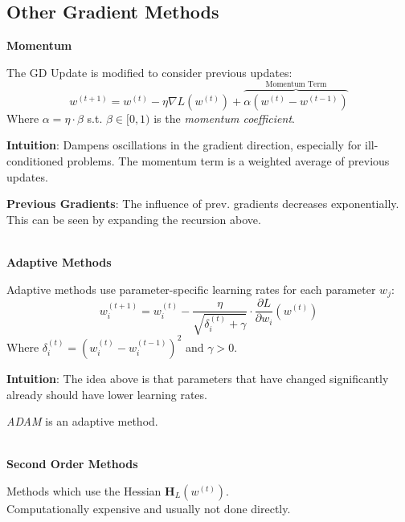 \newpage

\subsection{Other Gradient Methods}

\method \textbf{Momentum}

The GD Update is modified to consider previous updates:
$$
    w^{(t+1)} = w^{(t)} - \eta \nabla L(w^{(t)}) + \overbrace{\alpha (w^{(t)} - w^{(t-1)})}^\text{Momentum Term}
$$
Where $\alpha = \eta \cdot \beta$ s.t. $\beta \in [0,1)$ is the \textit{momentum coefficient}.

{\footnotesize
    \remark \textbf{Intuition}: Dampens oscillations in the gradient direction, especially for ill-conditioned problems. The momentum term is a weighted average of previous updates.

    \remark \textbf{Previous Gradients}: The influence of prev. gradients decreases exponentially. This can be seen by expanding the recursion above.
}
\\

\method \textbf{Adaptive Methods}

Adaptive methods use parameter-specific learning rates for each parameter $w_j$:
$$
    w^{(t+1)}_i = w^{(t)}_i - \frac{\eta}{\sqrt{\delta_i^{(t)} + \gamma}}\cdot\frac{\partial L}{\partial w_i}(w^{(t)})
$$
Where $\delta_i^{(t)} = (w_i^{(t)} - w_i^{(t-1)})^2$ and $\gamma>0$.

{\footnotesize
    \remark \textbf{Intuition}: The idea above is that parameters that have changed significantly already should have lower learning rates.

    \remark \textit{ADAM} is an adaptive method.
}
\\

\method \textbf{Second Order Methods}

Methods which use the Hessian $\mathbf{H}_L(w^{(t)})$.\\
Computationally expensive and usually not done directly.